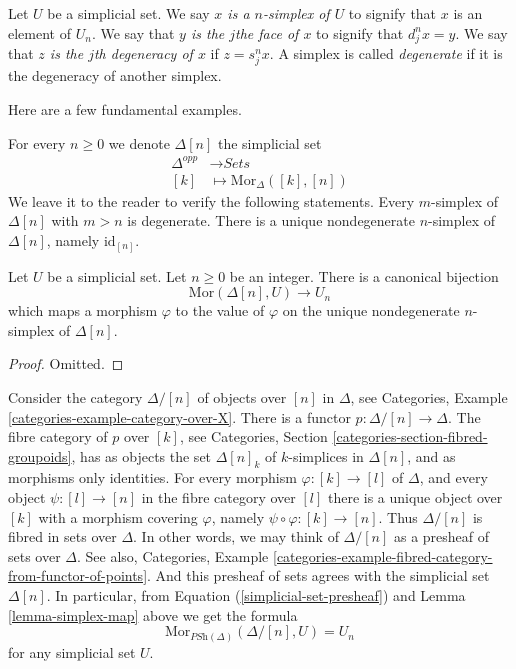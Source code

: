 \begin{definition}
\label{definition-terminology-simplicial-sets}
Let $U$ be a simplicial set. 
We say {\it $x$ is a $n$-simplex of $U$} to signify that
$x$ is an element of $U_n$. We say that {\it $y$ is the $j$the
face of $x$} to signify that $d^n_jx = y$. We say that
{\it $z$ is the $j$th degeneracy of $x$} if $z = s^n_jx$.
A simplex is called {\it degenerate} if it is the degeneracy
of another simplex.
\end{definition}

\noindent
Here are a few fundamental examples.

\begin{example}
\label{example-simplex-simplicial-set}
For every $n \geq 0$ we denote $\Delta[n]$ the simplicial set
\begin{align*}
\Delta^{opp} & \longrightarrow \textit{Sets} \\
[k] & \longmapsto \text{Mor}_{\Delta}([k], [n])
\end{align*}
We leave it to the reader to verify the following statements.
Every $m$-simplex of $\Delta[n]$ with $m > n$ is degenerate.
There is a unique nondegenerate $n$-simplex of $\Delta[n]$,
namely $\text{id}_{[n]}$.
\end{example}

\begin{lemma}
\label{lemma-simplex-map}
Let $U$ be a simplicial set. Let $n \geq 0$ be an integer.
There is a canonical bijection
$$
\text{Mor}(\Delta[n], U)
\longrightarrow
U_n
$$
which maps a morphism $\varphi$ to the value of $\varphi$
on the unique nondegenerate $n$-simplex of $\Delta[n]$.
\end{lemma}

\begin{proof}
Omitted.
\end{proof}

\begin{example}
\label{example-simplex-category}
Consider the category $\Delta/[n]$ of objects over $[n]$
in $\Delta$, see
Categories, Example \ref{categories-example-category-over-X}.
There is a functor $p : \Delta/[n] \to \Delta$.
The fibre category of $p$ over $[k]$, see
Categories, Section \ref{categories-section-fibred-groupoids},
has as objects the
set $\Delta[n]_k$ of $k$-simplices in $\Delta[n]$, and as
morphisms only identities. For every morphism
$\varphi : [k] \to [l]$ of $\Delta$, and every object $\psi : [l] \to [n]$
in the fibre category over $[l]$ there is a unique
object over $[k]$ with a morphism covering $\varphi$, namely
$\psi \circ \varphi : [k] \to [n]$. Thus $\Delta/[n]$
is fibred in sets over $\Delta$. In other words, we may
think of $\Delta/[n]$ as a presheaf of sets over $\Delta$.
See also, Categories,
Example \ref{categories-example-fibred-category-from-functor-of-points}.
And this presheaf of sets agrees with the simplicial set
$\Delta[n]$. In particular, from Equation
(\ref{simplicial-set-presheaf}) and 
Lemma \ref{lemma-simplex-map} above
we get the formula
$$
\text{Mor}_{\textit{PSh}(\Delta)}(\Delta/[n], U) = U_n
$$
for any simplicial set $U$.
\end{example}


